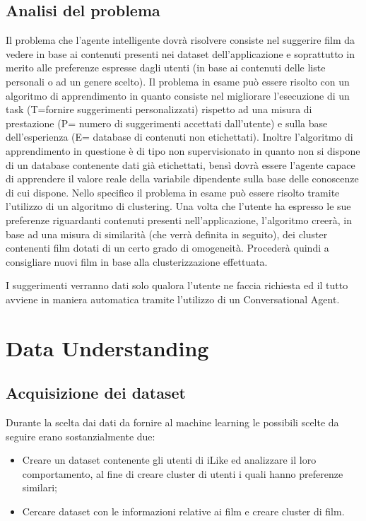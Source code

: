 \documentclass[a4paper, 12pt]{report}
\begin{document}
        \section{Analisi del problema}\label{sec:analisi-del-problema}

        Il problema che l'agente intelligente dovrà risolvere consiste nel suggerire film da vedere in base ai contenuti
        presenti nei dataset dell'applicazione e soprattutto in merito alle preferenze espresse dagli utenti (in base ai
        contenuti delle liste personali o ad un genere scelto).
        Il problema in esame può essere risolto con un algoritmo di apprendimento in quanto consiste nel migliorare l'esecuzione
        di un task (T=fornire suggerimenti personalizzati) rispetto ad una misura di prestazione (P= numero di suggerimenti accettati
        dall'utente) e sulla base dell'esperienza (E= database di contenuti non etichettati). Inoltre l'algoritmo di apprendimento
        in questione è di tipo non supervisionato in quanto non si dispone di un database contenente dati già etichettati, bensì dovrà
        essere l'agente capace di apprendere il valore reale della variabile dipendente sulla base delle conoscenze di cui dispone.
        Nello specifico il problema in esame può essere risolto tramite l'utilizzo di un algoritmo di clustering. Una volta che l'utente
        ha espresso le sue preferenze riguardanti contenuti presenti nell'applicazione, l'algoritmo creerà, in base ad una misura di similarità
        (che verrà definita in seguito), dei cluster contenenti film dotati di un certo grado di omogeneità. Procederà quindi a consigliare nuovi
        film in base alla clusterizzazione effettuata.

        I suggerimenti verranno dati solo qualora l'utente ne faccia richiesta ed il tutto avviene in maniera automatica tramite l'utilizzo
        di un Conversational Agent.

    \chapter{Data Understanding}\label{ch:data-understanding}

        \section{Acquisizione dei dataset}\label{sec:acquisizione-dei-dataset}
            Durante la scelta dai dati da fornire al machine learning le possibili scelte da seguire erano sostanzialmente due:
            \begin{itemize}
                \item Creare un dataset contenente gli utenti di iLike ed analizzare il loro comportamento, al fine di creare
                      cluster di utenti i quali hanno preferenze similari;
                \item Cercare dataset con le informazioni relative ai film e creare cluster di film.
            \end{itemize}
\end{document}
